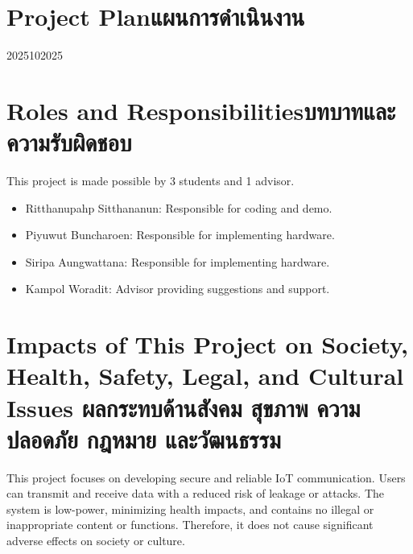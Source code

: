 \section{\ifenglish Project Plan\else แผนการดำเนินงาน\fi}

\begin{plan}{6}{2025}{10}{2025}
\end{plan}



\section{\ifenglish Roles and Responsibilities\else บทบาทและความรับผิดชอบ\fi}
This project is made possible by 3 students and 1 advisor.
 \begin{itemize} 
            \item Ritthanupahp Sitthananun: Responsible for coding and demo.
            \item Piyuwut Buncharoen: Responsible for implementing hardware.
            \item Siripa Aungwattana: Responsible for implementing hardware.
            \item Kampol Woradit: Advisor providing suggestions and support.
        \end{itemize}

\section{\ifenglish%
Impacts of This Project on Society, Health, Safety, Legal, and Cultural Issues
\else%
ผลกระทบด้านสังคม สุขภาพ ความปลอดภัย กฎหมาย และวัฒนธรรม
\fi}
This project focuses on developing secure and reliable IoT communication. Users can transmit and receive data with a reduced risk of leakage or attacks. The system is low-power, minimizing health impacts, and contains no illegal or inappropriate content or functions. Therefore, it does not cause significant adverse effects on society or culture.
